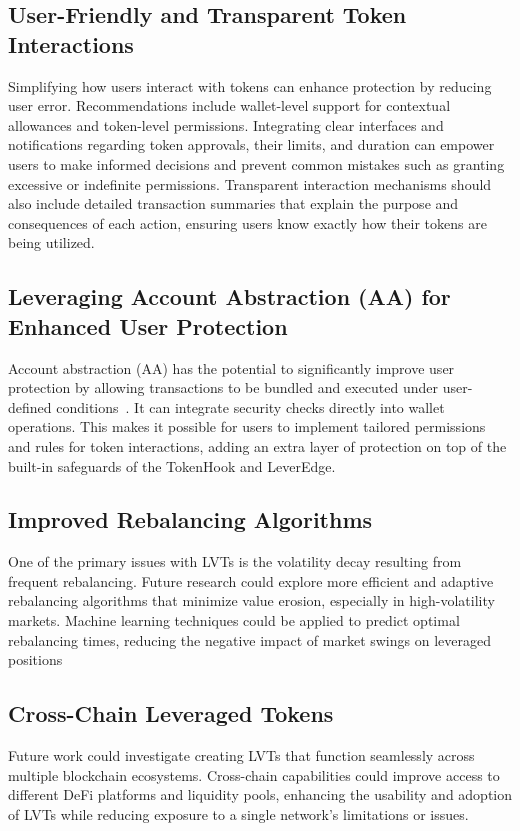 \subsection{User-Friendly and Transparent Token Interactions}
Simplifying how users interact with tokens can enhance protection by reducing user error. Recommendations include wallet-level support for contextual allowances and token-level permissions. Integrating clear interfaces and notifications regarding token approvals, their limits, and duration can empower users to make informed decisions and prevent common mistakes such as granting excessive or indefinite permissions. Transparent interaction mechanisms should also include detailed transaction summaries that explain the purpose and consequences of each action, ensuring users know exactly how their tokens are being utilized. 

\subsection{Leveraging Account Abstraction (AA) for Enhanced User Protection}
Account abstraction (AA) has the potential to significantly improve user protection by allowing transactions to be bundled and executed under user-defined conditions~\cite{Ethereum_AA}. It can integrate security checks directly into wallet operations. This makes it possible for users to implement tailored permissions and rules for token interactions, adding an extra layer of protection on top of the built-in safeguards of the TokenHook and LeverEdge.

\subsection{Improved Rebalancing Algorithms}
One of the primary issues with LVTs is the volatility decay resulting from frequent rebalancing. Future research could explore more efficient and adaptive rebalancing algorithms that minimize value erosion, especially in high-volatility markets. Machine learning techniques could be applied to predict optimal rebalancing times, reducing the negative impact of market swings on leveraged positions

\subsection{Cross-Chain Leveraged Tokens}
Future work could investigate creating LVTs that function seamlessly across multiple blockchain ecosystems. Cross-chain capabilities could improve access to different DeFi platforms and liquidity pools, enhancing the usability and adoption of LVTs while reducing exposure to a single network's limitations or issues.

